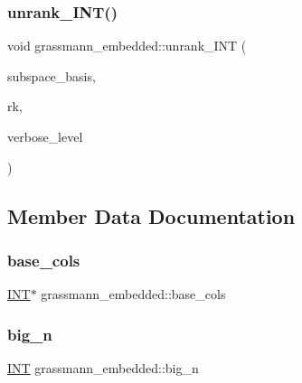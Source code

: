 \subsubsection{\texorpdfstring{unrank\+\_\+\+I\+N\+T()}{unrank\_INT()}}
{\footnotesize\ttfamily void grassmann\+\_\+embedded\+::unrank\+\_\+\+I\+NT (\begin{DoxyParamCaption}\item[{\mbox{\hyperlink{galois_8h_a09fddde158a3a20bd2dcadb609de11dc}{I\+NT}} $\ast$}]{subspace\+\_\+basis,  }\item[{\mbox{\hyperlink{galois_8h_a09fddde158a3a20bd2dcadb609de11dc}{I\+NT}}}]{rk,  }\item[{\mbox{\hyperlink{galois_8h_a09fddde158a3a20bd2dcadb609de11dc}{I\+NT}}}]{verbose\+\_\+level }\end{DoxyParamCaption})}



\subsection{Member Data Documentation}
\mbox{\label{classgrassmann__embedded_a50209e73ce006032128d203aa2a78c2e}} 
\subsubsection{\texorpdfstring{base\+\_\+cols}{base\_cols}}
{\footnotesize\ttfamily \mbox{\hyperlink{galois_8h_a09fddde158a3a20bd2dcadb609de11dc}{I\+NT}}$\ast$ grassmann\+\_\+embedded\+::base\+\_\+cols}

\mbox{\label{classgrassmann__embedded_aad39dd5ac4920ce008105a2261da36f4}} 
\subsubsection{\texorpdfstring{big\+\_\+n}{big\_n}}
{\footnotesize\ttfamily \mbox{\hyperlink{galois_8h_a09fddde158a3a20bd2dcadb609de11dc}{I\+NT}} grassmann\+\_\+embedded\+::big\+\_\+n}

\mbox{\label{classgrassmann__embedded_a3975bf60f089f9671a9b615db66f65f1}} 
